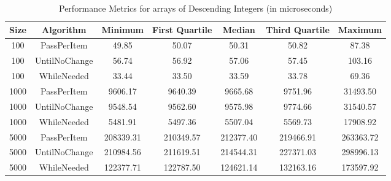 \documentclass{article}
\begin{document}
\begin{table}[htbp]
    \centering
    \begin{tabular}{ccccccc}
        \toprule
        \textbf{Size} & \textbf{Algorithm} & \textbf{Minimum} & \textbf{First Quartile} & \textbf{Median} & \textbf{Third Quartile} & \textbf{Maximum} \\
        \midrule
        100 & PassPerItem & 49.85 & 50.07 & 50.31 & 50.82 & 87.38 \\
        100 & UntilNoChange & 56.74 & 56.92 & 57.06 & 57.45 & 103.16 \\
        100 & WhileNeeded & 33.44 & 33.50 & 33.59 & 33.78 & 69.36 \\
        1000 & PassPerItem & 9606.17 & 9640.39 & 9665.68 & 9751.96 & 31493.50 \\
        1000 & UntilNoChange & 9548.54 & 9562.60 & 9575.98 & 9774.66 & 31540.57 \\
        1000 & WhileNeeded & 5481.91 & 5497.36 & 5507.04 & 5569.73 & 17908.92 \\
        5000 & PassPerItem & 208339.31 & 210349.57 & 212377.40 & 219466.91 & 263363.72 \\
        5000 & UntilNoChange & 210984.56 & 211619.51 & 214544.31 & 227371.03 & 298996.13 \\
        5000 & WhileNeeded & 122377.71 & 122787.50 & 124621.14 & 132163.16 & 173597.92 \\
        \bottomrule
    \end{tabular}
    \caption{Performance Metrics for arrays of Descending Integers (in microseconds)}
    \label{tab:performance}
\end{table}
\end{document}
